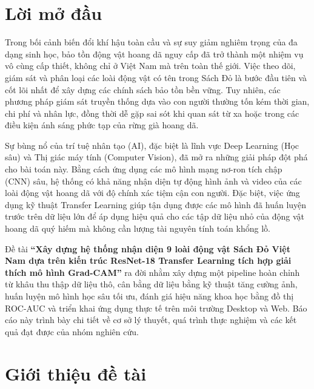 \documentclass[12pt,a4paper]{report}
\begin{document}

\tableofcontents
\newpage

\chapter*{Lời mở đầu}
Trong bối cảnh biến đổi khí hậu toàn cầu và sự suy giảm nghiêm trọng của đa dạng sinh học, bảo tồn động vật hoang dã nguy cấp đã trở thành một nhiệm vụ vô cùng cấp thiết, không chỉ ở Việt Nam mà trên toàn thế giới. Việc theo dõi, giám sát và phân loại các loài động vật có tên trong Sách Đỏ là bước đầu tiên và cốt lõi nhất để xây dựng các chính sách bảo tồn bền vững. Tuy nhiên, các phương pháp giám sát truyền thống dựa vào con người thường tốn kém thời gian, chi phí và nhân lực, đồng thời dễ gặp sai sót khi quan sát từ xa hoặc trong các điều kiện ánh sáng phức tạp của rừng già hoang dã.

Sự bùng nổ của trí tuệ nhân tạo (AI), đặc biệt là lĩnh vực Deep Learning (Học sâu) và Thị giác máy tính (Computer Vision), đã mở ra những giải pháp đột phá cho bài toán này. Bằng cách ứng dụng các mô hình mạng nơ-ron tích chập (CNN) sâu, hệ thống có khả năng nhận diện tự động hình ảnh và video của các loài động vật hoang dã với độ chính xác tiệm cận con người. Đặc biệt, việc ứng dụng kỹ thuật Transfer Learning giúp tận dụng được các mô hình đã huấn luyện trước trên dữ liệu lớn để áp dụng hiệu quả cho các tập dữ liệu nhỏ của động vật hoang dã quý hiếm mà không cần lượng tài nguyên tính toán khổng lồ.

Đề tài \textbf{“Xây dựng hệ thống nhận diện 9 loài động vật Sách Đỏ Việt Nam dựa trên kiến trúc ResNet-18 Transfer Learning tích hợp giải thích mô hình Grad-CAM”} ra đời nhằm xây dựng một pipeline hoàn chỉnh từ khâu thu thập dữ liệu thô, cân bằng dữ liệu bằng kỹ thuật tăng cường ảnh, huấn luyện mô hình học sâu tối ưu, đánh giá hiệu năng khoa học bằng đồ thị ROC-AUC và triển khai ứng dụng thực tế trên môi trường Desktop và Web. Báo cáo này trình bày chi tiết về cơ sở lý thuyết, quá trình thực nghiệm và các kết quả đạt được của nhóm nghiên cứu.
\newpage


\chapter{Giới thiệu đề tài}
\end{document}
